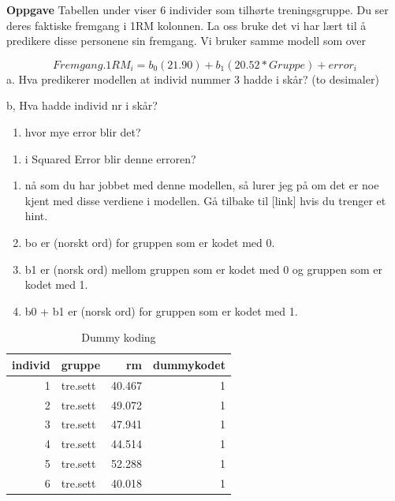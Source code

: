 \documentclass[
]{book}
\providecommand{\tightlist}{%
  \setlength{\itemsep}{0pt}\setlength{\parskip}{0pt}}
\begin{document}
\textbf{Oppgave}
Tabellen under viser 6 individer som tilhørte treningsgruppe. Du ser deres faktiske fremgang i 1RM kolonnen. La oss bruke det vi har lært til å predikere disse personene sin fremgang. Vi bruker samme modell som over

\[
Fremgang.1RM_i = b_0(21.90) + b_1(20.52*Gruppe) + error_i
\]
a. Hva predikerer modellen at individ nummer 3 hadde i skår? (to desimaler)

b, Hva hadde individ nr i skår?

\begin{enumerate}
\def\labelenumi{\alph{enumi}.}
\setcounter{enumi}{2}
\tightlist
\item
  hvor mye error blir det?
\end{enumerate}

\begin{enumerate}
\def\labelenumi{\alph{enumi}.}
\setcounter{enumi}{3}
\tightlist
\item
  i Squared Error blir denne erroren?
\end{enumerate}

\begin{enumerate}
\def\labelenumi{\alph{enumi}.}
\setcounter{enumi}{4}
\item
  nå som du har jobbet med denne modellen, så lurer jeg på om det er noe kjent med disse verdiene i modellen. Gå tilbake til {[}link{]} hvis du trenger et hint.
\item
  bo er (norskt ord) for gruppen som er kodet med 0.
\item
  b1 er (norsk ord) mellom gruppen som er kodet med 0 og gruppen som er kodet med 1.
\item
  b0 + b1 er (norsk ord) for gruppen som er kodet med 1.
\end{enumerate}

\begin{table}

\caption{\label{tab:unnamed-chunk-11}Dummy koding}
\centering
\begin{tabular}[t]{r|l|r|r}
\hline
individ & gruppe & rm & dummykodet\\
\hline
1 & tre.sett & 40.467 & 1\\
\hline
2 & tre.sett & 49.072 & 1\\
\hline
3 & tre.sett & 47.941 & 1\\
\hline
4 & tre.sett & 44.514 & 1\\
\hline
5 & tre.sett & 52.288 & 1\\
\hline
6 & tre.sett & 40.018 & 1\\
\hline
\end{tabular}
\end{table}
\end{document}
